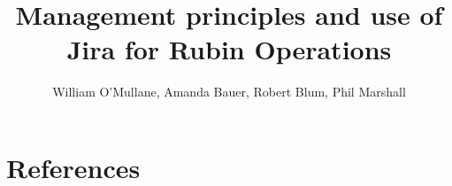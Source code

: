 \documentclass[DM,authoryear,toc]{lsstdoc}
\title{Management principles and use of Jira for Rubin Operations}
\author{%
William O'Mullane,  Amanda Bauer, Robert Blum, Phil Marshall
}
\date{\vcsDate}
\begin{document}
\maketitle



\appendix
\section{References} \label{sec:bib}
\renewcommand{\refname}{} %


%
\printglossaries
\end{document}
